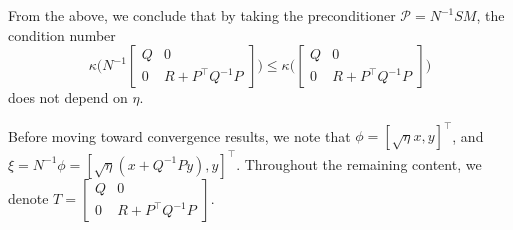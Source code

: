 \documentclass[11pt]{article}
\newcommand{\1}{\mathds{1}}
\begin{document}
From the above, we conclude that by taking the preconditioner $\mathcal{P} = N^{-1}SM$, the condition number 
\begin{equation}
    \kappa \Big(N^{-1}\begin{bmatrix}
        Q & 0\\
        0 &  R+P^\top Q^{-1} P 
    \end{bmatrix}\Big)\leq  \kappa\Big(\begin{bmatrix}
        Q & 0\\
        0 &  R+P^\top Q^{-1} P 
    \end{bmatrix}\Big)
\end{equation}
does not depend on $\eta$.

Before moving toward convergence results, we note that $\phi = [\sqrt{\eta} x, y]^\top$, and $\xi = N^{-1}\phi = [\sqrt{\eta}(x+Q^{-1}Py), y]^\top $. Throughout the remaining content, we denote $T=\begin{bmatrix}
        Q & 0\\
        0 &  R+P^\top Q^{-1} P 
    \end{bmatrix} $.
\end{document}
